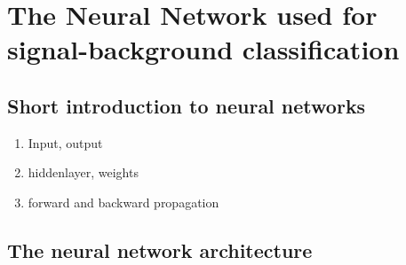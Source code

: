 \chapter{The Neural Network used for signal-background classification}
\section{Short introduction to neural networks}

\begin{enumerate}
    \item Input, output
    \item hiddenlayer, weights
    \item forward and backward propagation
\end{enumerate}
\section{The neural network architecture}
